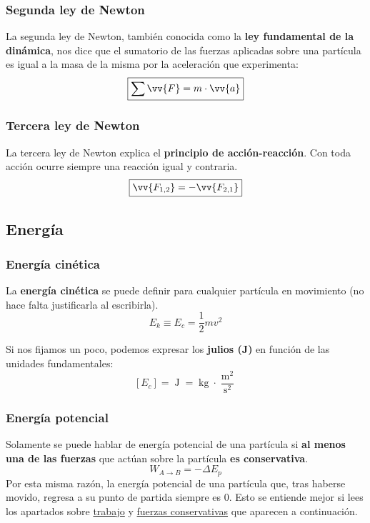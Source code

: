 \documentclass[a4paper]{book}
\numberwithin{figure}{chapter}
\numberwithin{equation}{chapter}
\newcommand{\s}{\operatorname{s}}
\newcommand{\m}{\operatorname{m}}
\newcommand{\J}{\operatorname{J}}
\newcommand{\kg}{\operatorname{kg}}
\renewcommand{\vec}[1]{\vv{{#1}}}
\begin{document}
\subsubsection{Segunda ley de Newton}
La segunda ley de Newton, también conocida como la \textbf{ley fundamental de la dinámica}, nos dice que el sumatorio de las fuerzas aplicadas sobre una partícula es igual a la masa de la misma por la aceleración que experimenta:
\begin{equation} \label{eq:segunda_ley_Newton}
	\boxed{\sum{\vec{F}} = m\cdot \vec{a}}
\end{equation}

\subsubsection{Tercera ley de Newton}
La tercera ley de Newton explica el \textbf{principio de acción-reacción}. Con toda acción ocurre siempre una reacción igual y contraria.
\begin{equation} \label{eq:tercera_ley_Newton}
	\boxed{\vec{F_{1,2}} = -\vec{F_{2,1}}}
\end{equation}
\subsection{Energía}
\subsubsection{Energía cinética}
La \textbf{energía cinética} se puede definir para cualquier partícula en movimiento (no hace falta justificarla al escribirla).\[E_k \equiv \boxed{E_c = \frac{1}{2}mv^2}\]

Si nos fijamos un poco, podemos expresar los \textbf{julios (J)} en función de las unidades fundamentales: \[[E_c] = \J = \kg \cdot \frac{\m ^2}{\s ^2}\]

\subsubsection{Energía potencial}
Solamente se puede hablar de energía potencial de una partícula si \textbf{al menos una de las fuerzas} que actúan sobre la partícula \textbf{es conservativa}.
\[\boxed{W_{A\to B} = -\Delta E_p}\]
Por esta misma razón, la energía potencial de una partícula que, tras haberse movido, regresa a su punto de partida siempre es 0.
Esto se entiende mejor si lees los apartados sobre \hyperref[subsec:trabajo]{trabajo} y \hyperref[subsec:fuerza_conservativa]{fuerzas conservativas} que aparecen a continuación.
\end{document}
